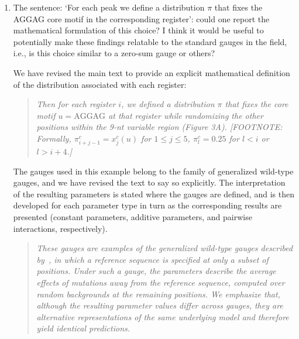 \documentclass[11pt]{article}
\newenvironment{response}{\par\color{responseblue}}{\par}
\newenvironment{msquote}
  {\begin{quote}\color{responseblue}\itshape\noindent\ignorespaces}
  {\end{quote}}
\begin{document}
\begin{enumerate}
\item The sentence: `For each peak we define a distribution $\pi$ that fixes the
AGGAG core motif in the corresponding register': could one report the
mathematical formulation of this choice? I think it would be useful to
potentially make these findings relatable to the standard gauges in the field,
i.e., is this choice similar to a zero-sum gauge or others?

\begin{response}
We have revised the main text to provide an explicit mathematical definition of the
distribution associated with each register:
\end{response}

\begin{msquote}
Then for each register $i$, we defined a distribution $\pi$ that fixes the core
motif $u=\textrm{AGGAG}$ at that register while randomizing the other positions
within the 9-nt variable region (Figure 3A). [FOOTNOTE: Formally,
$\pi_{i+j-1}^{c}=x_j^c(u)$ for $1\leq j \leq 5$, $\pi_l^c=0.25$ for $l<i$ or
$l>i+4$.]
\end{msquote}

\begin{response}
The gauges used in this example belong to the family of generalized wild-type
gauges, and we have revised the text to say so explicitly. The interpretation of
the resulting parameters is stated where the gauges are defined, and is then
developed for each parameter type in turn as the corresponding results are
presented (constant parameters, additive parameters, and pairwise interactions,
respectively).
\end{response}

\begin{msquote}
These gauges are examples of the generalized wild-type gauges described
by~\citet{Posfai2025aa}, in which a reference sequence is specified at only a
subset of positions. Under such a gauge, the parameters describe the average
effects of mutations away from the reference sequence, computed over random
backgrounds at the remaining positions. We emphasize that, although the
resulting parameter values differ across gauges, they are alternative
representations of the same underlying model and therefore yield identical
predictions.
\end{msquote}

\end{enumerate}



\end{document}
